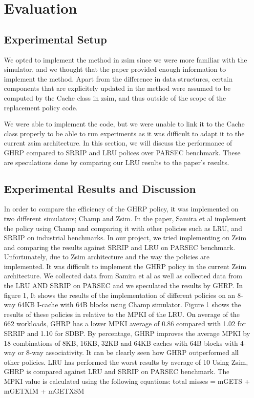 \documentclass[11pt]{article}
\begin{document}
\section{Evaluation}
\label{sec:Evaluation}

\subsection{Experimental Setup}
We opted to implement the method in zsim since we were more familiar with the simulator, and we thought that the paper provided enough information to implement the method.
Apart from the difference in data structures, certain components that are explicitely updated in the method were assumed to be computed by the Cache class in zsim, and thus outside of the scope of the replacement policy code.\par
We were able to implement the code, but we were unable to link it to the Cache class properly to be able to run experiments as it was difficult to adapt it to the current zsim architecture. 
In this section, we will discuss the performance of GHRP compared to SRRIP and LRU polices over PARSEC benchmark. These are speculations done by comparing our LRU results to the paper's results.

\subsection{Experimental Results and Discussion}
In order to compare the efficiency of the GHRP policy, it was implemented on two different simulators; Champ and Zsim. In the paper, Samira et al implement the policy using
Champ and comparing it with other policies such as LRU, and SRRIP on industrial benchmarks. In our project, we tried implementing on Zsim and comparing the results against 
SRRIP and LRU on PARSEC benchmark. Unfortunately, due to Zsim architecture and the way the policies are implemented. It was difficult to implement the GHRP policy in the 
current Zsim architecture. We collected data from Samira et al as well as collected data from the  LRU AND SRRIP on PARSEC and we speculated the results by GHRP. In figure 1,
It shows the results of the implementation of different policies on an 8-way 64KB I-cache with 64B blocks using Champ simulator. Figure 1 shows the results of these policies in
relative to the MPKI of the LRU. On average of the 662 workloads, GHRP has a lower MPKI average of 0.86 compared with 1.02 for SRRIP and 1.10 for SDBP. By percentage, GHRP 
improves the average MPKI by 18%
combinations of 8KB,  16KB, 32KB and 64KB caches with 64B blocks with 4-way or 8-way associativity. It can be clearly seen how GHRP outperformed all other policies. LRU has
performed the worst results by average of 10%
Using Zsim, GHRP is compared against LRU and SRRIP on PARSEC benchmark. The MPKI value is calculated using the following equations:  
total misses = mGETS + mGETXIM + mGETXSM
\end{document}
